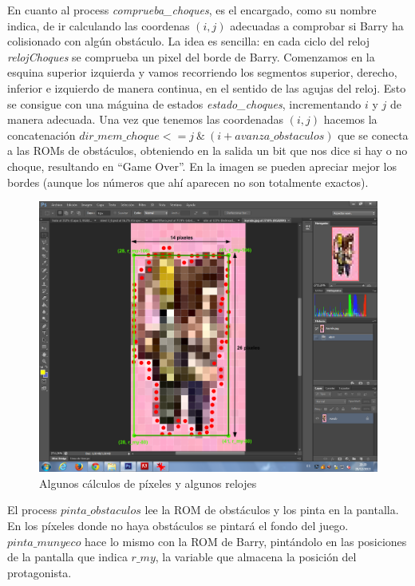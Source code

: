 \documentclass[11pt, a4paper, spanish, openright, twoside]{book}
\begin{document}
En cuanto al process \emph{comprueba\_choques}, es el encargado, como su nombre indica, de ir calculando las coordenas $(i, j)$ adecuadas a comprobar si Barry ha colisionado con algún obstáculo. La idea es sencilla: en cada ciclo del reloj \emph{relojChoques} se comprueba un pixel del borde de Barry. Comenzamos en la esquina superior izquierda y vamos recorriendo los segmentos superior, derecho, inferior e izquierdo de manera continua, en el sentido de las agujas del reloj. Esto se consigue con una máguina de estados \emph{estado\_choques}, incrementando $i$ y $j$ de manera adecuada. Una vez que tenemos las coordenadas $(i, j)$ hacemos la concatenación $dir\_mem\_choque <= j\ \&\ (i + avanza\_obstaculos)$ que se conecta a las ROMs de obstáculos, obteniendo en la salida un bit que nos dice si hay o no choque, resultando en ``Game Over''. En la imagen se pueden apreciar mejor los bordes (aunque los números que ahí aparecen no son totalmente exactos).


	\begin{figure}[!h]
		\centering
		\includegraphics[scale=0.39]{barryMedidas.png}
		\caption{Algunos cálculos de píxeles y algunos relojes}
	\end{figure}

El process $pinta\_obstaculos$ lee la ROM de obstáculos y los pinta en la pantalla. En los píxeles donde no haya obstáculos se pintará el fondo del juego. $pinta\_munyeco$ hace lo mismo con la ROM de Barry, pintándolo en las posiciones de la pantalla que indica $r\_my$, la variable que almacena la posición del protagonista.
\end{document}
